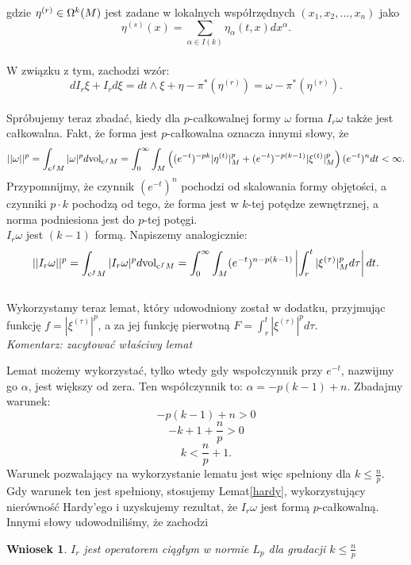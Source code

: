 \documentclass[licencjacka]{pracamgr}
\theoremstyle{definition}
\theoremstyle{definition}
\theoremstyle{plain}
\theoremstyle{plain}
\theoremstyle{plain}
\theoremstyle{plain}
\newtheorem{wniosek}{Wniosek}[section]
\def\cfm{\ensuremath\mathrm{c}^fM}
\def\M{\ensuremath M}
\begin{document}
gdzie $\eta^{(r)} \in \Omega^k (\M)$ jest zadane w lokalnych współrzędnych
$(x_1, x_2, ..., x_n)$ jako 
\[
    \eta^{(s)}(x) = \sum_{\alpha \in I(k)} \eta_\alpha(t, x) dx^\alpha.
\] \\

W związku z tym, zachodzi wzór:
\[
    d I_r \xi + I_r d \xi = dt \wedge \xi + \eta - \pi^\ast \left( \eta^{(r)} \right) =
      \omega - \pi^\ast(\eta^{(r)})
.
\] \\

Spróbujemy teraz zbadać, kiedy dla $p$-całkowalnej formy $\omega$ forma $I_r \omega$
także jest całkowalna. Fakt, że forma jest  $p$-całkowalna oznacza innymi słowy, że
\[
    || \omega ||^p = \int_{\cfm} |\omega|^p d \text{vol}_{\cfm} =
    \int_0^\infty \int_{\M} \left(
        (e^{-t})^{-pk} | \eta^{(t)}|^p_{\M} + 
        (e^{-t})^{-p(k-1)} | \xi^{(t)}|^p_{\M} 
    \right)
    (e^{-t})^{n} dt < \infty.
\]
Przypomnijmy, że czynnik $ (e^{-t})^{n} $ pochodzi od skalowania formy objętości, a
czynniki $p \cdot k$ pochodzą od tego, że forma jest w $k$-tej potędze zewnętrznej,
a norma podniesiona jest do $p$-tej potęgi. \\


$I_r \omega$ jest $(k-1)$ formą. Napiszemy analogicznie:
\[
    ||I_r \omega ||^p = 
    \int_{\cfm} |I_r \omega|^p  d\text{vol}_{\cfm} =
    \int_0^\infty \int_{\M} 
        (e^{-t})^{n-p(k-1)}
      \left| \int_r^t |\xi^{(\tau)} |^p_{\M} d\tau \right| dt.
\] \\

Wykorzystamy teraz lemat, który udowodniony został w dodatku, przyjmując
funkcję $f = |\xi^{(\tau)} |^p$, a za jej funkcję pierwotną 
$F = \int_r^t |\xi^{(\tau)}|^p d \tau $. \\
\emph{Komentarz: zacytować właściwy lemat}

Lemat możemy wykorzystać, tylko wtedy gdy 
wspołczynnik przy $e^{-t}$, nazwijmy go $\alpha$, jest większy od zera. Ten współczynnik to:
$\alpha = -p(k-1) + n$. Zbadajmy warunek:
\[
    -p(k-1) + n > 0
\]
\[
    -k + 1 + \frac{n}{p} > 0
\]
\[
    k < \frac{n}{p} + 1.
\]
Warunek pozwalający na wykorzystanie lematu jest więc spełniony dla $k \leq
\frac{n}{p}$. \\

Gdy warunek ten jest spełniony, stosujemy Lemat\ref{hardy},
wykorzystujący nierówność Hardy'ego i uzyskujemy rezultat, że $I_r \omega$ jest formą $p$-całkowalną. \\
Innymi słowy udowodniliśmy, że zachodzi
\begin{wniosek}
$I_r$ jest operatorem ciągłym w normie $L_p$ dla gradacji $k \leq \frac{n}{p}$
\end{wniosek}
\end{document}
